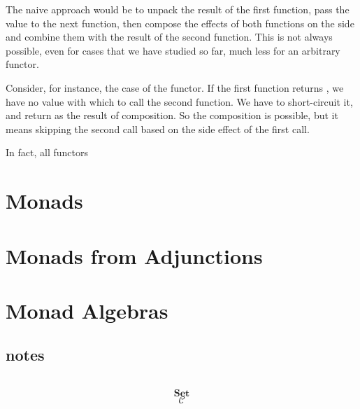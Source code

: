 \documentclass[DaoFP]{subfiles}
\begin{document}
The naive approach would be to unpack the result of the first function, pass the value to the next function, then compose the effects of both functions on the side and combine them with the result of the second function. This is not always possible, even for cases that we have studied so far, much less for an arbitrary functor.

Consider, for instance, the case of the  functor. If the first function returns , we have no value with which to call the second function. We have to short-circuit it, and return  as the result of composition. So the composition is possible, but it means skipping the second call based on the side effect of the first call. 

In fact, all functors 

\section{Monads}


\section{Monads from Adjunctions}

\section{Monad Algebras}


\subsection{notes}


\begin{exercise}
\end{exercise}

\begin{haskell}
\end{haskell}

\[
 \begin{tikzcd}
  \end{tikzcd}
\]

\[   \mathbf{Set} \]
\[   \mathcal{C} \]
\end{document}
